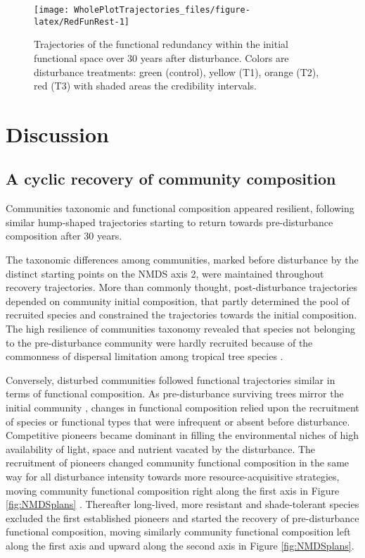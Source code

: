 \documentclass[fleqn,10pt]{ArtEcoFoG} %
\begin{document}
\begin{figure}

{\centering \texttt{[image: WholePlotTrajectories\_files/figure-latex/RedFunRest-1]} 

}

\caption{Trajectories of the functional redundancy within the initial functional space over 30 years after disturbance. Colors are disturbance treatments: green (control), yellow (T1), orange (T2), red (T3) with shaded areas the credibility intervals.}\label{fig:RedFunRest}
\end{figure}

\section{Discussion}\label{discussion}

\subsection{A cyclic recovery of community
composition}\label{a-cyclic-recovery-of-community-composition}

Communities taxonomic and functional composition appeared resilient,
following similar hump-shaped trajectories starting to return towards
pre-disturbance composition after 30 years.

The taxonomic differences among communities, marked before disturbance
by the distinct starting points on the NMDS axis 2, were maintained
throughout recovery trajectories. More than commonly thought,
post-disturbance trajectories depended on community initial composition,
that partly determined the pool of recruited species and constrained the
trajectories towards the initial composition. The high resilience of
communities taxonomy revealed that species not belonging to the
pre-disturbance community were hardly recruited because of the
commonness of dispersal limitation among tropical tree species
\citep{Svenning2005}.

Conversely, disturbed communities followed functional trajectories
similar in terms of functional composition. As pre-disturbance surviving
trees mirror the initial community \citep{Herault2018}, changes in
functional composition relied upon the recruitment of species or
functional types that were infrequent or absent before disturbance.
Competitive pioneers became dominant in filling the environmental niches
of high availability of light, space and nutrient vacated by the
disturbance. The recruitment of pioneers changed community functional
composition in the same way for all disturbance intensity towards more
resource-acquisitive strategies, moving community functional composition
right along the first axis in Figure \ref{fig:NMDSplans}
\citep{Westoby1998, Wright2004, Reich2014}. Thereafter long-lived, more
resistant and shade-tolerant species excluded the first established
pioneers and started the recovery of pre-disturbance functional
composition, moving similarly community functional composition left
along the first axis and upward along the second axis in Figure
\ref{fig:NMDSplans}.
\end{document}
